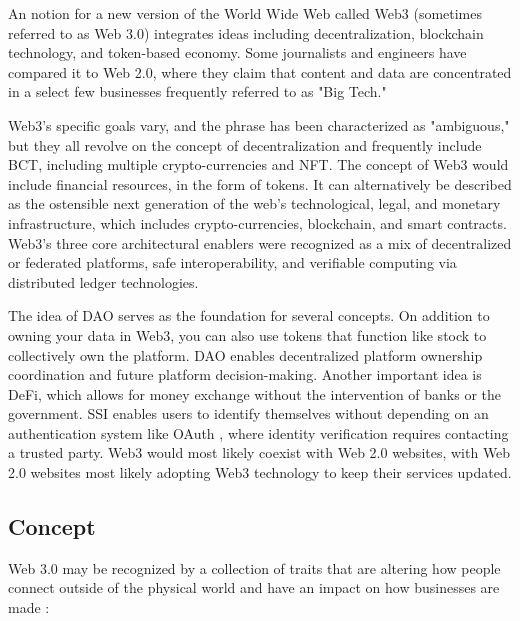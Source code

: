 \vspace{.5cm}

An notion for a new version of the World Wide Web called Web3 (sometimes referred to as Web 3.0) integrates ideas including decentralization, blockchain technology, and token-based economy. Some journalists and engineers have compared it to Web 2.0, where they claim that content and data are concentrated in a select few businesses frequently referred to as "Big Tech."

\vspace{.5cm}

Web3's specific goals vary, and the phrase has been characterized as "ambiguous," but they all revolve on the concept of decentralization and frequently include \ac{BCT}, including multiple crypto-currencies and \ac{NFT}. The concept of Web3 would include financial resources, in the form of tokens. It can alternatively be described as the ostensible next generation of the web's technological, legal, and monetary infrastructure, which includes crypto-currencies, blockchain, and smart contracts. Web3's three core architectural enablers were recognized as a mix of decentralized or federated platforms, safe interoperability, and verifiable computing via distributed ledger technologies.

\vspace{.5cm}

The idea of \ac{DAO} serves as the foundation for several concepts. On addition to owning your data in Web3, you can also use tokens that function like stock to collectively own the platform. \ac{DAO} enables decentralized platform ownership coordination and future platform decision-making. Another important idea is \ac{DeFi}, which allows for money exchange without the intervention of banks or the government. \ac{SSI} enables users to identify themselves without depending on an authentication system like OAuth \cite{oauth}, where identity verification requires contacting a trusted party. Web3 would most likely coexist with Web 2.0 websites, with Web 2.0 websites most likely adopting Web3 technology to keep their services updated.

\subsection{Concept}

Web 3.0 may be recognized by a collection of traits that are altering how people connect outside of the physical world and have an impact on how businesses are made \cite{concept}: 

